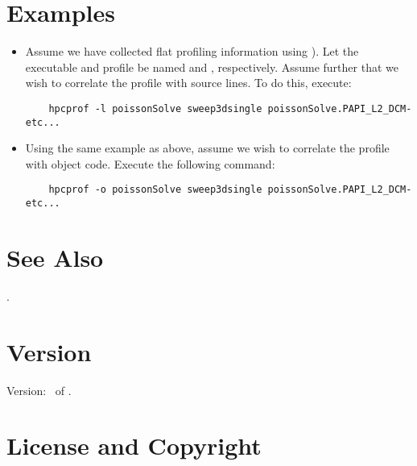 \documentclass[english]{article}
\begin{document}
\section{Examples}

\begin{itemize}

\item Assume we have collected flat profiling information using  ).
Let the executable and profile be named  and , respectively.
Assume further that we wish to correlate the profile with source lines.
To do this, execute:
\begin{verbatim}
    hpcprof -l poissonSolve sweep3dsingle poissonSolve.PAPI_L2_DCM-etc...
\end{verbatim}

\item Using the same example as above, assume we wish to correlate the profile with object code.  Execute the following command:
\begin{verbatim}
    hpcprof -o poissonSolve sweep3dsingle poissonSolve.PAPI_L2_DCM-etc...
\end{verbatim}

\end{itemize}


\section{See Also}

.

\section{Version}

Version: \Version\ of \Date.

\section{License and Copyright}
\end{document}
